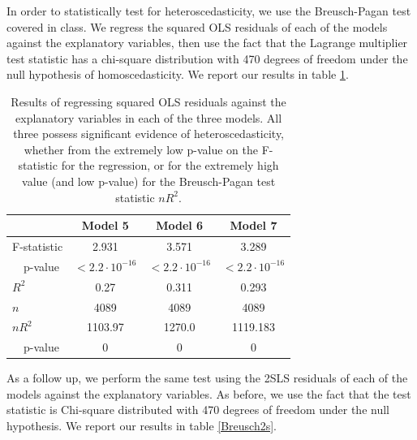 \documentclass{article}
\begin{document}
In order to statistically test for heteroscedasticity, we use the Breusch-Pagan test covered in class. We regress the squared OLS residuals of each of the models against the explanatory variables, then use the fact that the Lagrange multiplier test statistic has a chi-square distribution with 470 degrees of freedom under the null hypothesis of homoscedasticity. We report our results in table \ref{Breusch}.\\

\begin{table}
\center 
\begin{tabular}{| l | c | c | c|}
\hline
~ & Model 5 & Model 6 & Model 7 \\
\hline 

F-statistic & 2.931 & 3.571 & 3.289 \\
~~p-value & $ < 2.2\cdot10^{-16}$ & $< 2.2\cdot10^{-16}$ 
&$< 2.2\cdot10^{-16}$\\
$R^2$ &  0.27 & 0.311 &  0.293 \\
$n$ &  4089 & 4089 & 4089 \\
$nR^2$ & 1103.97 & 1270.0 & 1119.183 \\
~~p-value & 0 & 0 & 0\\
\hline
\end{tabular}
\label{Breusch}
\caption{Results of regressing squared OLS residuals against the explanatory variables in each of the three models. All three possess significant evidence of heteroscedasticity, whether from the extremely low p-value on the F-statistic for the regression, or for the extremely high value (and low p-value) for the Breusch-Pagan test statistic $nR^2$.}
\end{table}

As a follow up, we perform the same test using the 2SLS residuals of each of the models against the explanatory variables. As before, we use the fact that the test statistic is Chi-square distributed with 470 degrees of freedom under the null hypothesis. We report our results in table \ref{Breusch2s}.\\
\end{document}
